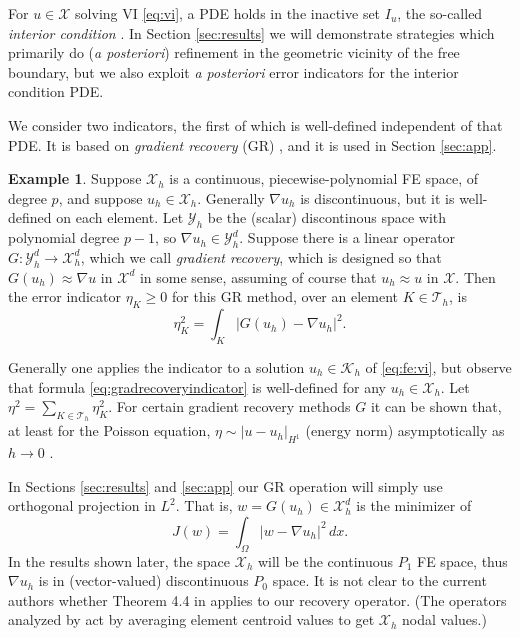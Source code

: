 \documentclass[]{interact}
\theoremstyle{plain}%
\theoremstyle{definition}
\newtheorem{example}[theorem]{Example}
\theoremstyle{remark}
\newcommand{\grad}{\nabla}
\newcommand{\cK}{\mathcal{K}}
\newcommand{\cT}{\mathcal{T}}
\newcommand{\cX}{\mathcal{X}}
\newcommand{\cY}{\mathcal{Y}}
\begin{document}
For $u\in\cX$ solving VI \eqref{eq:vi}, a PDE holds in the inactive set $I_u$, the so-called \emph{interior condition} \cite{KinderlehrerStampacchia1980}.  In Section \ref{sec:results} we will demonstrate strategies which primarily do (\emph{a posteriori}) refinement in the geometric vicinity of the free boundary, but we also exploit \emph{a posteriori} error indicators for the interior condition PDE.

We consider two indicators, the first of which is well-defined independent of that PDE.  It is based on \emph{gradient recovery} (GR) \cite[Chapter 4]{AinsworthOden2000}, and it is used in Section \ref{sec:app}.

\begin{example}  \label{example:gradrecovery}  Suppose $\cX_h$ is a continuous, piecewise-polynomial FE space, of degree $p$, and suppose $u_h\in\cX_h$.  Generally $\grad u_h$ is discontinuous, but it is well-defined on each element.  Let $\cY_h$ be the (scalar) discontinous space with polynomial degree $p-1$, so $\grad u_h \in \cY_h^d$.  Suppose there is a linear operator $G : \cY_h^d \to \cX_h^d$, which we call \emph{gradient recovery}, which is designed so that $G(u_h)\approx \grad u$ in $\cX^d$ in some sense, assuming of course that $u_h\approx u$ in $\cX$.  Then the error indicator $\eta_K\ge 0$ for this GR method, over an element $K \in\cT_h$, is
\begin{equation} \label{eq:gradrecoveryindicator}
\eta_K^2 = \int_K \left|G(u_h) - \grad u_h\right|^2.
\end{equation}
\end{example}

Generally one applies the indicator to a solution $u_h \in \cK_h$ of \eqref{eq:fe:vi}, but observe that formula \eqref{eq:gradrecoveryindicator} is well-defined for any $u_h \in \cX_h$.  Let $\eta^2 = \sum_{K\in\cT_h} \eta_K^2$.  For certain gradient recovery methods $G$ it can be shown that, at least for the Poisson equation, $\eta \sim |u-u_h|_{H^1}$ (energy norm) asymptotically as $h\to 0$ \cite[Theorem 4.4]{AinsworthOden2000}.

In Sections \ref{sec:results} and \ref{sec:app} our GR operation will simply use orthogonal projection in $L^2$.  That is, $w = G(u_h) \in \cX_h^d$ is the minimizer of
\begin{equation} \label{eq:gradrecoveryprojection}
J(w) = \int_\Omega |w - \grad u_h|^2\,dx.
\end{equation}
In the results shown later, the space $\cX_h$ will be the continuous $P_1$ FE space, thus $\grad u_h$ is in (vector-valued) discontinuous $P_0$ space.  It is not clear to the current authors whether Theorem 4.4 in \cite{AinsworthOden2000} applies to our recovery operator.  (The operators analyzed by \cite{AinsworthOden2000} act by averaging element centroid values to get $\cX_h$ nodal values.)
\end{document}
